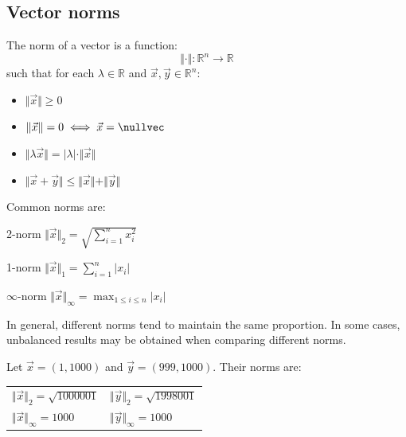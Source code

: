 \subsection{Vector norms}
The norm of a vector is a function: 
\begin{equation*}
    \Vert \cdot \Vert: \mathbb{R}^n \rightarrow \mathbb{R}
\end{equation*}
such that for each $\lambda \in \mathbb{R}$ and $\vec{x}, \vec{y} \in \mathbb{R}^n$:
\begin{itemize}
    \item $\Vert \vec{x} \Vert \geq 0$
    \item $\Vert \vec{x} \Vert = 0 \iff \vec{x} = \nullvec$
    \item $\Vert \lambda \vec{x} \Vert = \vert \lambda \vert \cdot \Vert \vec{x} \Vert$
    \item $\Vert \vec{x} + \vec{y} \Vert \leq \Vert \vec{x} \Vert + \Vert \vec{y} \Vert$
\end{itemize}
%
Common norms are:
\begin{descriptionlist}
    \item[2-norm] $\Vert \vec{x} \Vert_2 = \sqrt{ \sum_{i=1}^{n} x_i^2 }$
    
    \item[1-norm] $\Vert \vec{x} \Vert_1 = \sum_{i=1}^{n} \vert x_i \vert$
    
    \item[$\infty$-norm] $\Vert \vec{x} \Vert_{\infty} = \max_{1 \leq i \leq n} \vert x_i \vert$
\end{descriptionlist}
%
In general, different norms tend to maintain the same proportion.
In some cases, unbalanced results may be obtained when comparing different norms.
\begin{example}
    Let $\vec{x} = (1, 1000)$ and $\vec{y} = (999, 1000)$. Their norms are:
    \begin{center}
        \begin{tabular}{l l}
            $\Vert \vec{x} \Vert_{2} = \sqrt{1000001}$ & $\Vert \vec{y} \Vert_{2} = \sqrt{1998001}$ \\
            $\Vert \vec{x} \Vert_{\infty} = 1000$ & $\Vert \vec{y} \Vert_{\infty} = 1000$ \\
        \end{tabular} 
    \end{center}
\end{example}


